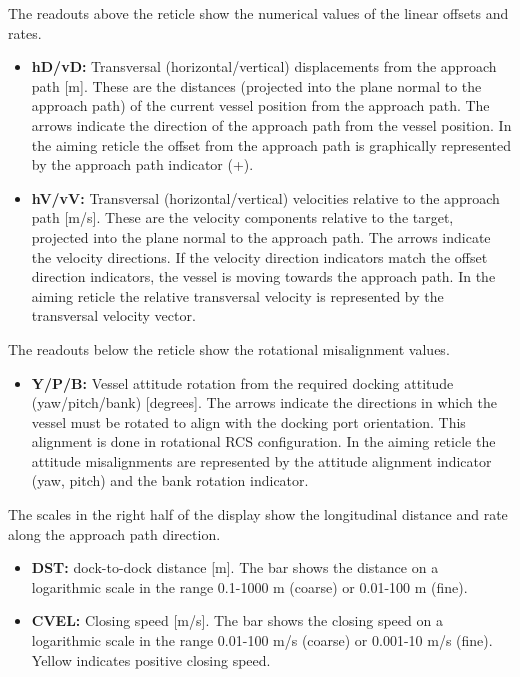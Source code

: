 \documentclass[Orbiter User Manual.tex]{subfiles}
\begin{document}
\noindent
The readouts above the reticle show the numerical values of the linear offsets and rates.

\begin{itemize}
\item \textbf{hD/vD:} Transversal (horizontal/vertical) displacements from the approach path [m]. These are the distances (projected into the plane normal to the approach path) of the current vessel position from the approach path. The arrows indicate the direction of the approach path from the vessel position. In the aiming reticle the offset from the approach path is graphically represented by the approach path indicator (+).
\item \textbf{hV/vV:} Transversal (horizontal/vertical) velocities relative to the approach path [m/s]. These are the velocity components relative to the target, projected into the plane normal to the approach path. The arrows indicate the velocity directions. If the velocity direction indicators match the offset direction indicators, the vessel is moving towards the approach path. In the aiming reticle the relative transversal velocity is represented by the transversal velocity vector.
\end{itemize}

\noindent
The readouts below the reticle show the rotational misalignment values.

\begin{itemize}
\item \textbf{Y/P/B:} Vessel attitude rotation from the required docking attitude (yaw/pitch/bank) [degrees]. The arrows indicate the directions in which the vessel must be rotated to align with the docking port orientation. This alignment is done in rotational RCS configuration. In the aiming reticle the attitude misalignments are represented by the attitude alignment indicator (yaw, pitch) and the bank rotation indicator.
\end{itemize}

\noindent
The scales in the right half of the display show the longitudinal distance and rate along the approach path direction.

\begin{itemize}
\item \textbf{DST:} dock-to-dock distance [m]. The bar shows the distance on a logarithmic scale in the range 0.1-1000 m (coarse) or 0.01-100 m (fine).
\item \textbf{CVEL:} Closing speed [m/s]. The bar shows the closing speed on a logarithmic scale in the range 0.01-100 m/s (coarse) or 0.001-10 m/s (fine). Yellow indicates positive closing speed.
\end{itemize}
\end{document}
